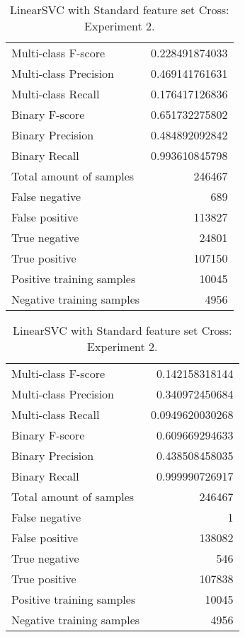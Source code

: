 \begin{table}[H]
\begin{minipage}{0.5\textwidth}
\caption{LinearSVC with Standard feature set Cross: Experiment 1.}
\centering
\begin{tabular}{l r}
\toprule
Multi-class F-score & 0.228491874033 \\
Multi-class Precision & 0.469141761631 \\
Multi-class Recall & 0.176417126836 \\
\midrule
Binary F-score & 0.651732275802 \\
Binary Precision & 0.484892092842 \\
Binary Recall & 0.993610845798 \\
\midrule
Total amount of samples & 246467 \\
False negative & 689 \\
False positive & 113827 \\
True negative & 24801 \\
True positive & 107150 \\
\midrule
Positive training samples & 10045 \\
Negative training samples & 4956 \\
\bottomrule
\end{tabular}
\end{minipage}
\hfillx
\begin{minipage}{0.5\textwidth}
\caption{LinearSVC with Standard feature set Cross: Experiment 2.}
\centering
\begin{tabular}{l r}
\toprule
Multi-class F-score & 0.142158318144 \\
Multi-class Precision & 0.340972450684 \\
Multi-class Recall & 0.0949620030268 \\
\midrule
Binary F-score & 0.609669294633 \\
Binary Precision & 0.438508458035 \\
Binary Recall & 0.999990726917 \\
\midrule
Total amount of samples & 246467 \\
False negative & 1 \\
False positive & 138082 \\
True negative & 546 \\
True positive & 107838 \\
\midrule
Positive training samples & 10045 \\
Negative training samples & 4956 \\
\bottomrule
\end{tabular}
\end{minipage}
\end{table}
